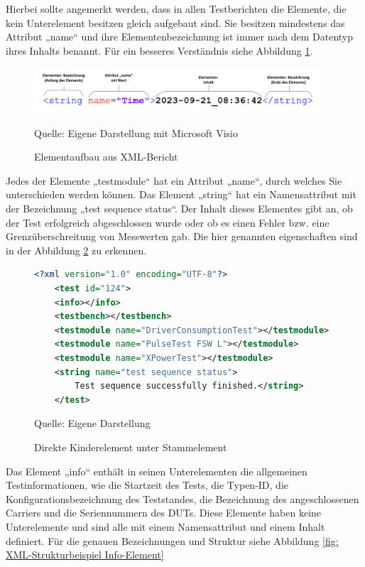 Hierbei sollte angemerkt werden, dass in allen Testberichten die Elemente, die kein Unterelement besitzen gleich aufgebaut sind.
Sie besitzen mindestens das Attribut „name“ und ihre Elementenbezeichnung ist immer nach dem Datentyp ihres Inhalts benannt.
Für ein besseres Verständnis siehe Abbildung \ref{fig: Elementaufbau aus XML-Bericht}.

\begin{figure}[H]
    \centering
    \includegraphics[width=0.95\textwidth]{Grafiken/Elementaufbau}
    \caption{Elementaufbau aus XML-Bericht}
    \label{fig: Elementaufbau aus XML-Bericht}
    {Quelle: Eigene Darstellung mit Microsoft Visio}
\end{figure}

Jedes der Elemente „testmodule“ hat ein Attribut
„name“, durch welches Sie unterschieden werden können. Das Element „string“ hat
ein Namensattribut mit der Bezeichnung „test sequence status“. Der Inhalt
dieses Elementes gibt an, ob der Test erfolgreich abgeschlossen wurde oder ob
es einen Fehler bzw. eine Grenzüberschreitung von Messwerten gab.
Die hier genannten eigenschaften sind in der Abbildung \ref{fig: Direkte Kinderelement unter Stammelement} zu erkennen.

\begin{figure}[H]
\centering
\begin{minipage}{0.95\textwidth}
\begin{lstlisting}[language=XML]
<?xml version="1.0" encoding="UTF-8"?>
    <test id="124">
    <info></info>
    <testbench></testbench>
    <testmodule name="DriverConsumptionTest"></testmodule>
    <testmodule name="PulseTest FSW L"></testmodule>
    <testmodule name="XPowerTest"></testmodule>
    <string name="test sequence status">
        Test sequence successfully finished.</string>
    </test>
\end{lstlisting}
\end{minipage}
\caption{Direkte Kinderelement unter Stammelement}
\label{fig: Direkte Kinderelement unter Stammelement}
    {Quelle: Eigene Darstellung}
\end{figure}


Das Element „info“ enthält in seinen Unterelementen die allgemeinen Testinformationen, wie die Startzeit des Tests,
die Typen-ID, die Konfigurationsbezeichnung des Teststandes, die Bezeichnung des angeschlossenen Carriers und die
Seriennummern des \ac{DUTs}. Diese Elemente haben keine Unterelemente und sind alle mit einem Namensattribut und einem Inhalt definiert.
Für die genauen Bezeichnungen und Struktur siehe Abbildung \ref{fig: XML-Strukturbeispiel Info-Element}

